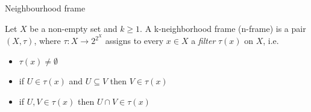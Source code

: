

\begin{frame}{Neighbourhood frame}
  \begin{definition}
    
    Let $X$ be a non-empty set and $k \geq 1$. A k-neighborhood frame (n-frame) is a pair $(X, \tau)$, 
     where $\tau : X \to 2^{2^X}$ assigns to every 
    $x \in X$ a \emph{filter} $\tau(x)$ on $X$, i.e. 
    \begin{itemize}
      \item $\tau(x) \neq \emptyset$
      \item if $U \in \tau(x)$ and $U \subseteq V$ then $V \in \tau(x)$
      \item if $U,V \in \tau(x)$ then $U \cap V \in \tau(x)$
    \end{itemize} 
  \end{definition}
\end{frame}

